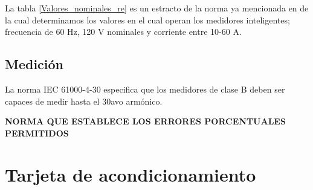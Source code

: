 \begin{table}[H]
\centering
\caption{\label{Valores_nominales_re}Valores nominales de operacion de la red eléctrica, extracto norma E-354-D-1608}
\end{table}

\par La tabla \ref{Valores_nominales_re} es un estracto de la norma ya mencionada en
 de la cual determinamos los valores en el cual operan los medidores inteligentes;
 frecuencia de 60 Hz, 120 V nominales y corriente entre 10-60 A.

\subsection{Medición}

La norma IEC 61000-4-30 especifica que los medidores de clase B deben ser capaces
 de medir hasta el 30avo armónico.

\textbf{NORMA QUE ESTABLECE LOS ERRORES PORCENTUALES PERMITIDOS}

\section{Tarjeta de acondicionamiento}%




